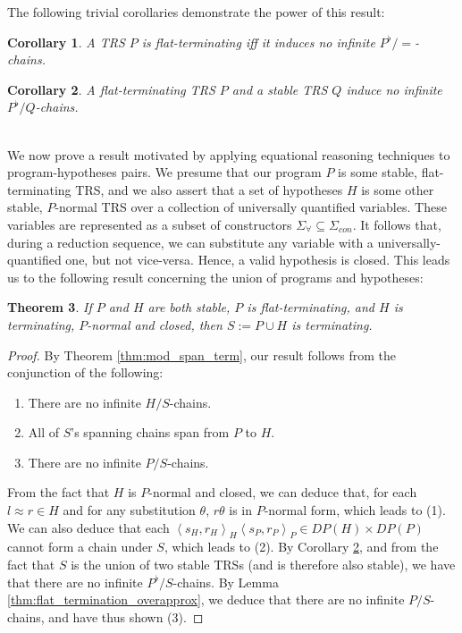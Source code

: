 \documentclass{article}
\newtheorem{theorem}{Theorem}%
\newtheorem{corollary}[theorem]{Corollary}
\theoremstyle{definition}
\newcommand{\dpair}[2]{\left\langle #1, #2 \right\rangle}
\begin{document}
The following trivial corollaries demonstrate the power of this result:
\begin{corollary} \label{thm:flat_chain_equality}
    A TRS $P$ is flat-terminating iff it induces no infinite $P^\flat/\!\!=$-chains.  
\end{corollary}
\begin{corollary} \label{thm:flat_term_stable}
    A flat-terminating TRS $P$ and a stable TRS $Q$ induce no infinite $P^\flat/Q$-chains.
\end{corollary}
~\\
We now prove a result motivated by applying equational reasoning techniques to program-hypotheses pairs. We presume that our program $P$ is some stable, flat-terminating TRS, and we also assert that a set of hypotheses $H$ is some other stable, $P$-normal TRS over a collection of universally quantified variables. These variables are represented as a subset of constructors $\Sigma_\forall \subseteq \Sigma_{con}$. It follows that, during a reduction sequence, we can substitute any variable with a universally-quantified one, but not vice-versa. Hence, a valid hypothesis is closed. This leads us to the following result concerning the union of programs and hypotheses:
\begin{theorem}
    If $P$ and $H$ are both stable, $P$ is flat-terminating, and $H$ is terminating, $P$-normal and closed, then $S := P \cup H$ is terminating.
\end{theorem}

\begin{proof}
    By Theorem \ref{thm:mod_span_term}, our result follows from the conjunction of the following: \begin{enumerate}
        \item There are no infinite $H/S$-chains.
        \item All of $S$'s spanning chains span from $P$ to $H$.
        \item There are no infinite $P/S$-chains.
    \end{enumerate}
    From the fact that $H$ is $P$-normal and closed, we can deduce that, for each $l \approx r \in H$ and for any substitution $\theta$, $r\theta$ is in $P$-normal form, which leads to (1). We can also deduce that each $\dpair{s_H}{r_H}_H \dpair{s_P}{r_P}_P \in DP(H) \times DP(P)$ cannot form a chain under $S$, which leads to (2). By Corollary \ref{thm:flat_term_stable}, and from the fact that $S$ is the union of two stable TRSs (and is therefore also stable), we have that there are no infinite $P^\flat/S$-chains. By Lemma \ref{thm:flat_termination_overapprox}, we deduce that there are no infinite $P/S$-chains, and have thus shown (3). 
\end{proof}
\end{document}
